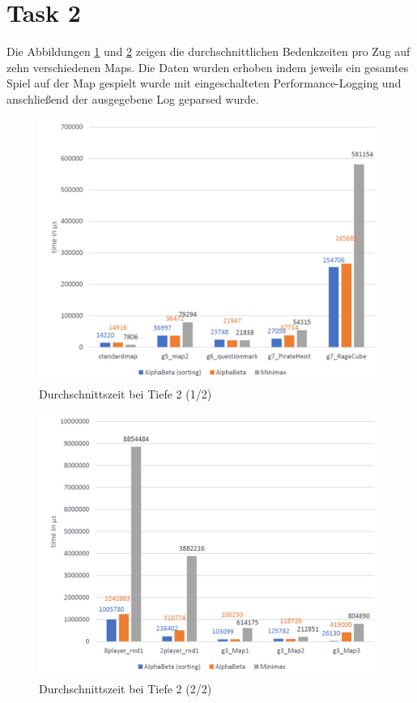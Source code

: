 \section{Task 2}
Die Abbildungen \ref{fig::avgtime Depth2.1} und \ref{fig::avgtime Depth 2.2} zeigen die durchschnittlichen Bedenkzeiten pro Zug auf zehn verschiedenen Maps. Die Daten wurden erhoben indem jeweils ein gesamtes Spiel auf der Map gespielt wurde mit eingeschalteten Performance-Logging und anschließend der ausgegebene Log geparsed wurde.\\
\begin{figure}[h]
	\begin{center}
		\includegraphics[scale=0.5]{Depth_2_1_avgtime.pdf}
		\caption{Durchschnittszeit bei Tiefe 2 (1/2)}
		\label{fig::avgtime Depth2.1}
	\end{center}
\end{figure}
\begin{figure}[h]
	\begin{center}
		\includegraphics[scale=0.5]{Depth_2_2_avgtime.pdf}
		\caption{Durchschnittszeit bei Tiefe 2 (2/2)}
		\label{fig::avgtime Depth 2.2}
	\end{center}
\end{figure}
